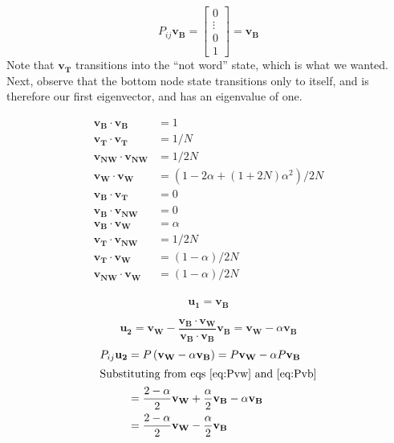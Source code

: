 \documentclass[11pt]{article}
\begin{document}
\begin{equation}\label{eq:Pvb}
P_{ij}\mathbf{v_B} = \left[\begin{array}{c}
0\\\vdots\\0\\1
\end{array}\right] = \mathbf{v_B}
\end{equation}
Note that $\mathbf{v_T}$ transitions into the ``not word'' state, which is what we wanted. Next, observe that the bottom node state transitions only to itself, and is therefore our first eigenvector, and has an eigenvalue of one.


\begin{align}
\mathbf{v_B}\cdot\mathbf{v_B} &= 1\\
\mathbf{v_T}\cdot\mathbf{v_T} &= 1/N\\
\mathbf{v_{NW}}\cdot\mathbf{v_{NW}} &= 1/2N\\
\mathbf{v_W}\cdot\mathbf{v_W} &= (1 - 2\alpha + (1+2N)\alpha^2)/2N\\
\mathbf{v_B}\cdot\mathbf{v_T} &= 0\\
\mathbf{v_B}\cdot\mathbf{v_{NW}} &= 0\\
\mathbf{v_B}\cdot\mathbf{v_W} &= \alpha\\
\mathbf{v_T}\cdot\mathbf{v_{NW}} &= 1/2N\\
\mathbf{v_T}\cdot\mathbf{v_W} &= (1-\alpha)/2N\\
\mathbf{v_{NW}}\cdot\mathbf{v_W} &= (1-\alpha)/2N\\
\end{align}

\begin{equation}
\mathbf{u_1} = \mathbf{v_B}
\end{equation}

\begin{equation}
\mathbf{u_2} = \mathbf{v_W} - \frac{\mathbf{v_B}\cdot\mathbf{v_W}}{\mathbf{v_B}\cdot\mathbf{v_B}}\mathbf{v_B}=\mathbf{v_W} - \alpha\mathbf{v_B}
\end{equation}
\begin{align}
P_{ij}\mathbf{u_2} &= P\left(\mathbf{v_W} -\alpha\mathbf{v_B}\right) = P\mathbf{v_W} -\alpha P\mathbf{v_B}\\
\intertext{Substituting from eqs \ref{eq:Pvw} and \ref{eq:Pvb}}
&= \frac{2-\alpha}{2} \mathbf{v_W} + \frac{\alpha}{2}\mathbf{v_B} - \alpha\mathbf{v_B}\\
&=\frac{2-\alpha}{2} \mathbf{v_W}-\frac{\alpha}{2}\mathbf{v_B}
\end{align}
\end{document}
